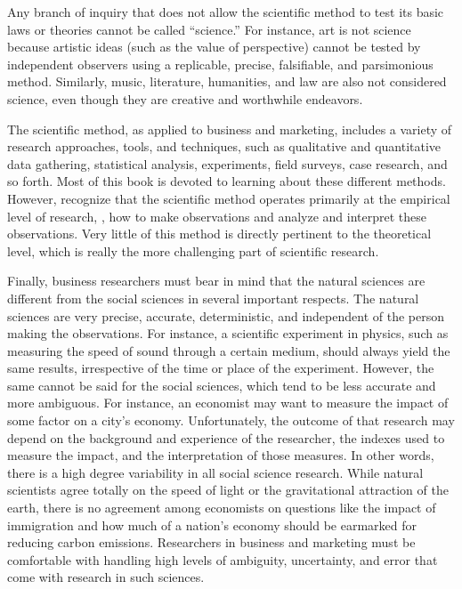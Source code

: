 Any branch of inquiry that does not allow the scientific method to test its basic laws or theories cannot be called ``science.'' For instance, art is not science because artistic ideas (such as the value of perspective) cannot be tested by independent observers using a replicable, precise, falsifiable, and parsimonious method. Similarly, music, literature, humanities, and law are also not considered science, even though they are creative and worthwhile endeavors.

The scientific method, as applied to business and marketing, includes a variety of research approaches, tools, and techniques, such as qualitative and quantitative data gathering, statistical analysis, experiments, field surveys, case research, and so forth. Most of this book is devoted to learning about these different methods. However, recognize that the scientific method operates primarily at the empirical level of research, \ie, how to make observations and analyze and interpret these observations. Very little of this method is directly pertinent to the theoretical level, which is really the more challenging part of scientific research.

Finally, business researchers must bear in mind that the natural sciences are different from the social sciences in several important respects. The natural sciences are very precise, accurate, deterministic, and independent of the person making the observations. For instance, a scientific experiment in physics, such as measuring the speed of sound through a certain medium, should always yield the same results, irrespective of the time or place of the experiment. However, the same cannot be said for the social sciences, which tend to be less accurate and more ambiguous. For instance, an economist may want to measure the impact of some factor on a city's economy. Unfortunately, the outcome of that research may depend on the background and experience of the researcher, the indexes used to measure the impact, and the interpretation of those measures. In other words, there is a high degree variability in all social science research. While natural scientists agree totally on the speed of light or the gravitational attraction of the earth, there is no agreement among economists on questions like the impact of immigration and how much of a nation's economy should be earmarked for reducing carbon emissions. Researchers in business and marketing must be comfortable with handling high levels of ambiguity, uncertainty, and error that come with research in such sciences.

